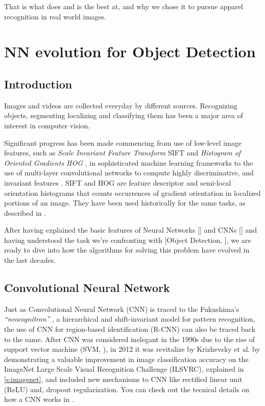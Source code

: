 That is what \maskrcnn does and is the best at, and why we chose it to pursue apparel recognition in real world images.



\section{NN evolution for Object Detection}\label{s:nnevo}

\subsection{Introduction}\label{s:nnevo-intro}

Images and videos are collected everyday by different sources. Recognizing objects, segmenting localizing and classifying them has been a major area of interest in computer vision.

Significant progress has been made commencing from use of low-level image features, such as \emph {Scale Invariant Feature Transform}  SIFT \cite{lowe1999object} and \emph{ Histogram of Oriented Gradients HOG }\cite{dalal2005histograms} , in sophisticated machine learning frameworks to the use of multi-layer convolutional networks to compute highly discriminative, and invariant features \cite{Girshick_2014}. SIFT and HOG are feature descriptor and semi-local orientation histograms that counts occurrences of gradient orientation in localized portions of an image. They have been used historically for the same tasks, as described in .


After having explained the basic features of Neural Networks [] and CNNs [] and having understood the task we're confronting with [Object Detection, ], we are ready to dive into how the algorithms for solving this problem have evolved in the last decades.

\subsection{Convolutional Neural Network}\label{s:nnevo-cnn}

Just as Convolutional Neural Network (CNN) is traced to the Fukushima’s \emph{ “neocognitron”} \cite{fukushima1980neocognitron}, a hierarchical and shift-invariant model for pattern recognition, the use of CNN for region-based identification (R-CNN)\cite{Girshick_2014} can also be traced back to the same.  After CNN was considered inelegant in the 1990s due to the rise of support vector machine (SVM, ), in 2012 it was revitalize by Krizhevsky et al. \cite{krizhevsky2012imagenet} by demonstrating a valuable improvement in image classification accuracy on the ImageNet Large Scale Visual Recognition Challenge (ILSVRC), explained in \ref{s:imagenet}, and included new mechanisms to CNN like rectified linear unit (ReLU) and, dropout regularization. You can check out the tecnical details on how a CNN works in .

